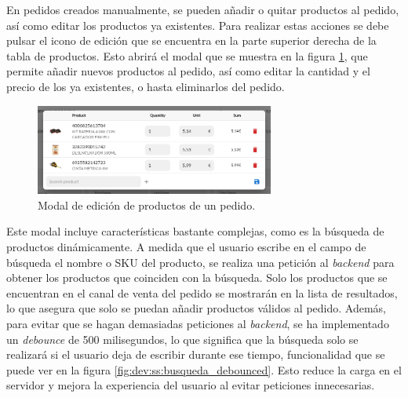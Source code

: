 En pedidos creados manualmente, se pueden añadir o quitar productos al pedido, así como editar los productos ya existentes. Para realizar estas acciones se debe pulsar el icono de edición que se encuentra en la parte superior derecha de la tabla de productos. Esto abrirá el modal que se muestra en la figura \ref{fig:dev:ss:modal_edicion_productos_pedido}, que permite añadir nuevos productos al pedido, así como editar la cantidad y el precio de los ya existentes, o hasta eliminarlos del pedido.

\begin{figure}
    \centering
    \includegraphics[width=0.7\textwidth]{figures/design_develop/screenshots/modal_edicion_productos_pedido.png}
    \caption{Modal de edición de productos de un pedido.}
    \label{fig:dev:ss:modal_edicion_productos_pedido}
\end{figure}

Este modal incluye características bastante complejas, como es la búsqueda de productos dinámicamente. A medida que el usuario escribe en el campo de búsqueda el nombre o SKU del producto, se realiza una petición al \textit{backend} para obtener los productos que coinciden con la búsqueda. Solo los productos que se encuentran en el canal de venta del pedido se mostrarán en la lista de resultados, lo que asegura que solo se puedan añadir productos válidos al pedido. Además, para evitar que se hagan demasiadas peticiones al \textit{backend}, se ha implementado un \textit{debounce} de 500 milisegundos, lo que significa que la búsqueda solo se realizará si el usuario deja de escribir durante ese tiempo, funcionalidad que se puede ver en la figura \ref{fig:dev:ss:busqueda_debounced}. Esto reduce la carga en el servidor y mejora la experiencia del usuario al evitar peticiones innecesarias.

